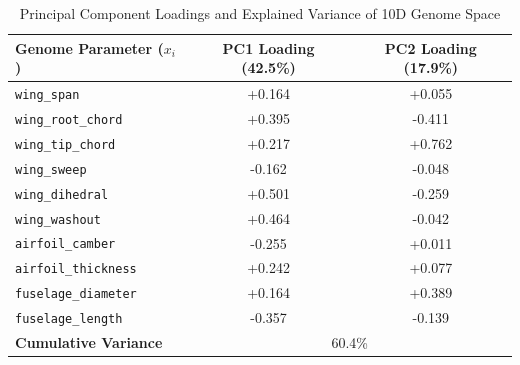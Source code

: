 \begin{table}[t]
\centering
\caption{Principal Component Loadings and Explained Variance of 10D Genome Space}
\label{tab:pca_loadings}
\begin{tabular}{lcc}
\hline
\textbf{Genome Parameter ($x_i$)} & \textbf{PC1 Loading (42.5\%)} & \textbf{PC2 Loading (17.9\%)} \\
\hline
\texttt{wing\_span} & +0.164 & +0.055 \\
\texttt{wing\_root\_chord} & +0.395 & -0.411 \\
\texttt{wing\_tip\_chord} & +0.217 & +0.762 \\
\texttt{wing\_sweep} & -0.162 & -0.048 \\
\texttt{wing\_dihedral} & +0.501 & -0.259 \\
\texttt{wing\_washout} & +0.464 & -0.042 \\
\texttt{airfoil\_camber} & -0.255 & +0.011 \\
\texttt{airfoil\_thickness} & +0.242 & +0.077 \\
\texttt{fuselage\_diameter} & +0.164 & +0.389 \\
\texttt{fuselage\_length} & -0.357 & -0.139 \\
\hline
\textbf{Cumulative Variance} & \multicolumn{2}{c}{60.4\%} \\
\hline
\end{tabular}
\end{table}
